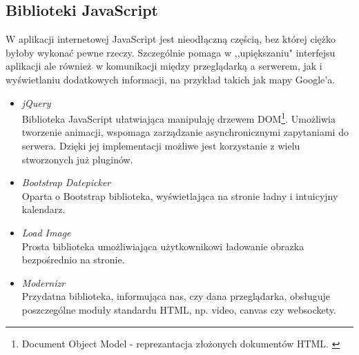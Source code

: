   \subsection{Biblioteki JavaScript}
    W aplikacji internetowej JavaScript\cite{java_script} jest nieodłączną częścią, bez której ciężko byłoby wykonać pewne rzeczy. Szczególnie pomaga w ,,upiększaniu" interfejsu aplikacji ale również w komunikacji między przeglądarką a serwerem, jak i wyświetlaniu dodatkowych informacji, na przykład takich jak mapy Google'a.

    \begin{itemize}
      \item \emph{jQuery} \\ Biblioteka JavaScript ułatwiająca manipulaję drzewem DOM\footnote{Document Object Model - reprezantacja złożonych dokumentów HTML. \cite{html5_css3}}. Umożliwia tworzenie animacji, wspomaga zarządzanie asynchronicznymi zapytaniami do serwera. Dzięki jej implementacji możliwe jest korzystanie z wielu stworzonych już pluginów.
      \item \emph{Bootstrap Datepicker} \\ Oparta o Bootstrap biblioteka, wyświetlająca na stronie ładny i intuicyjny kalendarz.
      \item \emph{Load Image} \\ Prosta biblioteka umożliwiająca użytkownikowi ładowanie obrazka bezpośrednio na stronie.
      \item \emph{Modernizr} \\ Przydatna biblioteka, informująca nas, czy dana przeglądarka, obsługuje poszczególne moduły standardu HTML, np. video, canvas czy websockety.
    \end{itemize}
